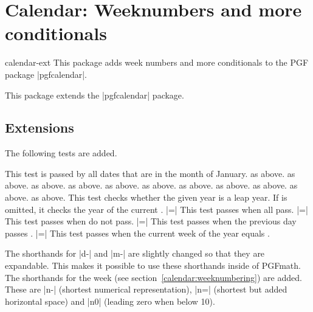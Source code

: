 %
%
%

\section{Calendar: Weeknumbers and more conditionals}
\begin{package}{calendar-ext}
  This package adds week numbers and more conditionals to the PGF package |pgfcalendar|.
\end{package}

This package extends the |pgfcalendar| package.

\subsection{Extensions}

The following tests are added.
\begin{itemize}
 This test is passed by all dates that are in the month of January.
 as above.
 as above.
 as above.
 as above.
 as above.
 as above.
 as above.
 as above.
 as above.
 as above.
 as above.
    This test checks whether the given year is a leap year. If
     is omitted, it checks the year of the current .
|=|
    This test passes when all  pass.
|=|
    This test passes when  do not pass.
|=|
    This test passes when the previous day passes .
|=|
    This test passes when the current week of the year equals .
\end{itemize}

The shorthands for |d-| and |m-| are slightly changed so that they are
expandable. This makes it possible to use these shorthands inside of PGFmath.
The shorthands for the week (see section~\ref{calendar:weeknumbering})
are added. These are |n-| (shortest numerical representation), |n=|
(shortest but added horizontal space) and |n0| (leading zero when below 10).


